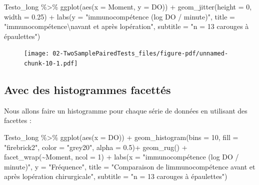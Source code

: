 \documentclass[
  a4paper,
  DIV=11,
  numbers=noendperiod,
  oneside]{scrreprt}
\newenvironment{Shaded}{}{}
\newcommand{\AttributeTok}[1]{\textcolor[rgb]{0.84,0.23,0.29}{#1}}
\newcommand{\DecValTok}[1]{\textcolor[rgb]{0.00,0.36,0.77}{#1}}
\newcommand{\FloatTok}[1]{\textcolor[rgb]{0.00,0.36,0.77}{#1}}
\newcommand{\FunctionTok}[1]{\textcolor[rgb]{0.44,0.26,0.76}{#1}}
\newcommand{\NormalTok}[1]{\textcolor[rgb]{0.14,0.16,0.18}{#1}}
\newcommand{\SpecialCharTok}[1]{\textcolor[rgb]{0.00,0.36,0.77}{#1}}
\newcommand{\StringTok}[1]{\textcolor[rgb]{0.01,0.18,0.38}{#1}}
\begin{document}
\begin{Shaded}
\begin{Highlighting}[]
\NormalTok{Testo\_long }\SpecialCharTok{\%\textgreater{}\%}
  \FunctionTok{ggplot}\NormalTok{(}\FunctionTok{aes}\NormalTok{(}\AttributeTok{x =}\NormalTok{ Moment, }\AttributeTok{y =}\NormalTok{ DO)) }\SpecialCharTok{+}
  \FunctionTok{geom\_jitter}\NormalTok{(}\AttributeTok{height =} \DecValTok{0}\NormalTok{, }\AttributeTok{width =} \FloatTok{0.25}\NormalTok{) }\SpecialCharTok{+}
  \FunctionTok{labs}\NormalTok{(}\AttributeTok{y =} \StringTok{"immunocompétence (log DO / minute)"}\NormalTok{,}
       \AttributeTok{title =} \StringTok{"immunocompétence}\SpecialCharTok{\textbackslash{}n}\StringTok{avant et après l\textquotesingle{}opération"}\NormalTok{,}
       \AttributeTok{subtitle =} \StringTok{"n = 13 carouges à épaulettes"}\NormalTok{)}
\end{Highlighting}
\end{Shaded}

\begin{figure}[H]

{\centering \texttt{[image: 02-TwoSamplePairedTests\_files/figure-pdf/unnamed-chunk-10-1.pdf]}

}

\end{figure}

\hypertarget{avec-des-histogrammes-facettuxe9s}{%
\subsection{Avec des histogrammes
facettés}\label{avec-des-histogrammes-facettuxe9s}}

Nous allons faire un histogramme pour chaque série de données en
utilisant des facettes :

\begin{Shaded}
\begin{Highlighting}[]
\NormalTok{Testo\_long }\SpecialCharTok{\%\textgreater{}\%}
  \FunctionTok{ggplot}\NormalTok{(}\FunctionTok{aes}\NormalTok{(}\AttributeTok{x =}\NormalTok{ DO)) }\SpecialCharTok{+}
  \FunctionTok{geom\_histogram}\NormalTok{(}\AttributeTok{bins =} \DecValTok{10}\NormalTok{, }\AttributeTok{fill =} \StringTok{"firebrick2"}\NormalTok{, }\AttributeTok{color =} \StringTok{"grey20"}\NormalTok{, }\AttributeTok{alpha =} \FloatTok{0.5}\NormalTok{)}\SpecialCharTok{+}
  \FunctionTok{geom\_rug}\NormalTok{() }\SpecialCharTok{+}
  \FunctionTok{facet\_wrap}\NormalTok{(}\SpecialCharTok{\textasciitilde{}}\NormalTok{Moment, }\AttributeTok{ncol =} \DecValTok{1}\NormalTok{) }\SpecialCharTok{+}
  \FunctionTok{labs}\NormalTok{(}\AttributeTok{x =} \StringTok{"immunocompétence (log DO / minute)"}\NormalTok{,}
       \AttributeTok{y =} \StringTok{"Fréquence"}\NormalTok{,}
       \AttributeTok{title =} \StringTok{"Comparaison de l\textquotesingle{}immunocompétence avant et après l\textquotesingle{}opération chirurgicale"}\NormalTok{,}
       \AttributeTok{subtitle =} \StringTok{"n = 13 carouges à épaulettes"}\NormalTok{)}
\end{Highlighting}
\end{Shaded}
\end{document}

